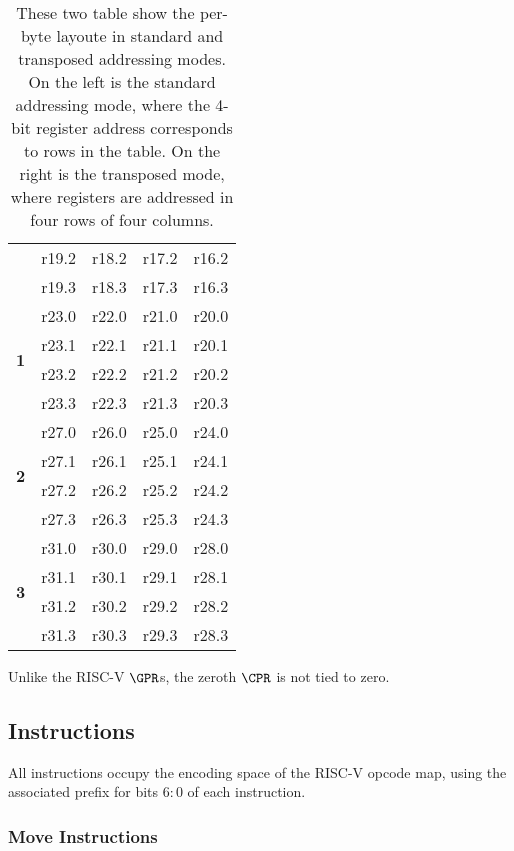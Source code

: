 \begin{table}[h!]
\begin{tabular}{|l|l|l|l|l|}
                            & r19.2   & r18.2   & r17.2   & r16.2   \\
                            & r19.3   & r18.3   & r17.3   & r16.3   \\ \hline
\multirow{4}{*}{\textbf{1}} & r23.0   & r22.0   & r21.0   & r20.0   \\
                            & r23.1   & r22.1   & r21.1   & r20.1   \\
                            & r23.2   & r22.2   & r21.2   & r20.2   \\
                            & r23.3   & r22.3   & r21.3   & r20.3   \\ \hline
\multirow{4}{*}{\textbf{2}} & r27.0   & r26.0   & r25.0   & r24.0   \\
                            & r27.1   & r26.1   & r25.1   & r24.1   \\
                            & r27.2   & r26.2   & r25.2   & r24.2   \\
                            & r27.3   & r26.3   & r25.3   & r24.3   \\ \hline
\multirow{4}{*}{\textbf{3}} & r31.0   & r30.0   & r29.0   & r28.0   \\
                            & r31.1   & r30.1   & r29.1   & r28.1   \\
                            & r31.2   & r30.2   & r29.2   & r28.2   \\
                            & r31.3   & r30.3   & r29.3   & r28.3   \\ \hline
\end{tabular}
\caption{These two table show the per-byte layoute in standard and transposed
addressing modes. On the left is the standard addressing mode, where the
4-bit register address corresponds to rows in the table. On the right
is the transposed mode, where registers are addressed in four rows of
four columns.}
\label{tab:state-addr}
\end{table}

Unlike the RISC-V $\GPR$s, the zeroth $\CPR$ is not tied to zero.

\subsection{Instructions}

All instructions occupy the \encspace encoding space of the RISC-V opcode
map, using the associated \encopcode prefix for bits $6:0$ of each 
instruction.

\subsubsection{Move Instructions}
